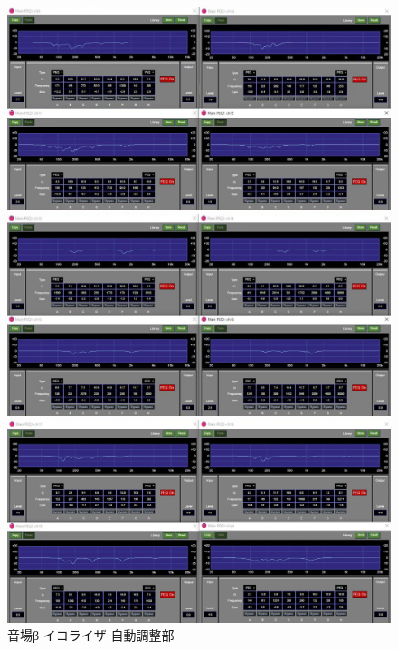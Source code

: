 \documentclass[11pt,a4j]{jreport}
\begin{document}
\begin{figure}[H]
  \begin{minipage}[b]{.5\linewidth}
    \centering
    \includegraphics[width=.9\linewidth]{images/experimentField/afcParameters/02beta/03autoEQ3.jpg}
  \end{minipage}%
  \begin{minipage}[b]{.5\linewidth}
    \centering
    \includegraphics[width=.9\linewidth]{images/experimentField/afcParameters/02beta/03autoEQ4.jpg}
  \end{minipage}

  \begin{minipage}[b]{1\linewidth}
    \centering
    \includegraphics[width=.45\linewidth]{images/experimentField/afcParameters/02beta/03autoEQ5.jpg}
  \end{minipage}

  \centering
  \caption{音場β イコライザ 自動調整部}
  \label{fig:betaイコライザ自動調整部}
\end{figure}
\newpage
\end{document}
